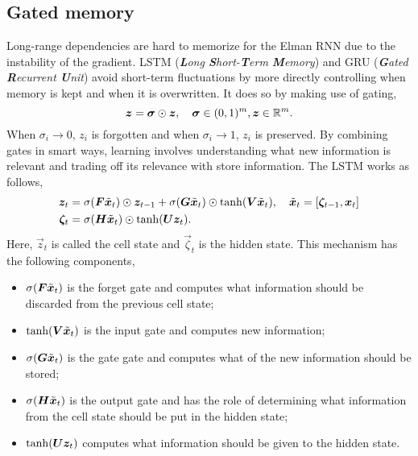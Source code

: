 \subsection{Gated memory}

Long-range dependencies are hard to memorize for the Elman RNN due to the instability of the
gradient. LSTM (\textit{\textbf{L}ong \textbf{S}hort-\textbf{T}erm \textbf{M}emory})
\citep{schmidhuber1997long} and GRU (\textit{\textbf{G}ated \textbf{R}ecurrent \textbf{U}nit})
\citep{cho2014learning} avoid short-term fluctuations by more directly controlling when memory is
kept and when it is overwritten. It does so by making use of gating, \[
    \bm{z} = \bm{\sigma} \odot \bm{z}, \quad \bm{\sigma} \in (0,1)^m, \bm{z} \in \mathbb{R}^m.
\]
When $\sigma_i \to 0$, $z_i$ is forgotten and when $\sigma_i \to 1$, $z_i$ is preserved. By
combining gates in smart ways, learning involves understanding what new information is relevant and
trading off its relevance with store information. The LSTM works as follows,
\begin{align*}
    \vec{z}_t     & = \sigma \lft( \mat{F} \tilde{\vec{x}}_t \rgt) \odot \vec{z}_{t-1} + \sigma \lft( \mat{G} \tilde{\vec{x}}_t \rgt) \odot \tanh \lft( \mat{V}\tilde{\vec{x}}_t \rgt), \quad \tilde{\vec{x}}_t = \lft[ \vec{\zeta}_{t-1}, \vec{x}_t \rgt] \\
    \vec{\zeta}_t & = \sigma \lft( \mat{H} \tilde{\vec{x}}_t \rgt) \odot \tanh \lft( \mat{U} \vec{z}_t \rgt).
\end{align*}
Here, $\vec{z}_t$ is called the cell state and $\vec{\zeta}_t$ is the hidden state. This mechanism has the following components,
\begin{itemize}
    \item $\sigma(\bm{F}\tilde{\bm{x}}_t)$ is the forget gate and computes what information should be discarded from the previous cell state;
    \item $\tanh(\bm{V}\tilde{\bm{x}}_t)$ is the input gate and computes new information;
    \item $\sigma(\bm{G}\tilde{\bm{x}}_t)$ is the gate gate and computes what of the new information should be stored;
    \item $\sigma(\bm{H} \tilde{\bm{x}}_t)$ is the output gate and has the role of determining what information from the cell state should be put in the hidden state;
    \item $\tanh(\bm{U} \bm{z}_t)$ computes what information should be given to the hidden state.
\end{itemize}

